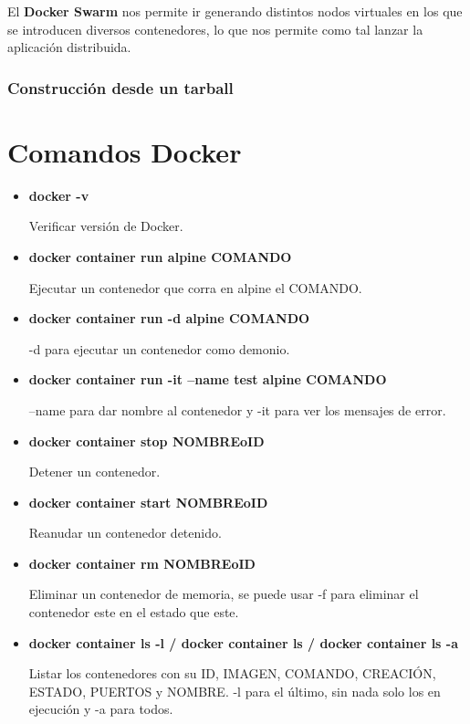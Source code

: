\documentclass[12pt, twoside, openright]{report} %
\begin{document}
El \textbf{Docker Swarm} nos permite ir generando distintos nodos virtuales en los que se introducen diversos contenedores, lo que nos permite como tal lanzar la aplicación distribuida.

\subsubsection{Construcción desde un tarball}



\section{Comandos Docker}

\begin{itemize}
	\item \textbf{docker -v}

	      Verificar versión de Docker.

	\item \textbf{docker container run alpine COMANDO}

	      Ejecutar un contenedor que corra en alpine el COMANDO.

	\item \textbf{docker container run -d alpine COMANDO}

	      -d para ejecutar un contenedor como demonio.

	\item \textbf{docker container run -it --name test alpine COMANDO}

	      --name para dar nombre al contenedor y -it para ver los mensajes de error.

	\item \textbf{docker container stop NOMBREoID}

	      Detener un contenedor.

	\item \textbf{docker container start NOMBREoID}

	      Reanudar un contenedor detenido.

	\item \textbf{docker container rm NOMBREoID}

	      Eliminar un contenedor de memoria, se puede usar -f para eliminar el contenedor este en el estado que este.

	\item \textbf{docker container ls -l / docker container ls / docker container ls -a}

	      Listar los contenedores con su ID, IMAGEN, COMANDO, CREACIÓN, ESTADO, PUERTOS y NOMBRE.
	      -l para el último, sin nada solo los en ejecución y -a para todos.


\end{itemize}
\end{document}
